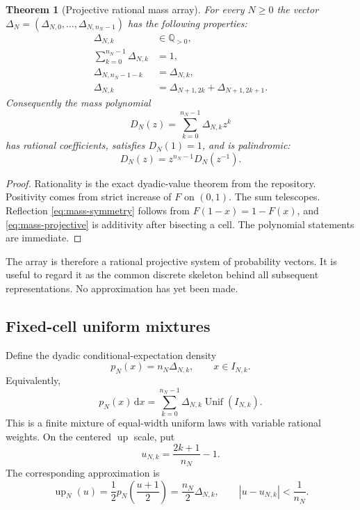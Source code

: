 \documentclass[11pt,oneside]{article}
\newtheorem{theorem}{Theorem}[section]
\theoremstyle{definition}
\theoremstyle{remark}
\newcommand{\Q}{\mathbb Q}
\newcommand{\Up}{\operatorname{up}}
\newcommand{\dd}{\,\mathrm d}
\begin{document}
\begin{theorem}[Projective rational mass array]
\label{thm:projective-masses}
For every $N\ge0$ the vector
$\Delta_N=(\Delta_{N,0},\ldots,\Delta_{N,n_N-1})$ has the following properties:
\begin{align}
 \Delta_{N,k}&\in\Q_{>0},\label{eq:mass-rational}\\
 \sum_{k=0}^{n_N-1}\Delta_{N,k}&=1,\label{eq:mass-sum}\\
 \Delta_{N,n_N-1-k}&=\Delta_{N,k},\label{eq:mass-symmetry}\\
 \Delta_{N,k}&=\Delta_{N+1,2k}+\Delta_{N+1,2k+1}.
 \label{eq:mass-projective}
\end{align}
Consequently the mass polynomial
\begin{equation}\label{eq:mass-polynomial}
 D_N(z)=\sum_{k=0}^{n_N-1}\Delta_{N,k}z^k
\end{equation}
has rational coefficients, satisfies $D_N(1)=1$, and is palindromic:
\begin{equation}\label{eq:D-palindromic}
 D_N(z)=z^{n_N-1}D_N(z^{-1}).
\end{equation}
\end{theorem}

\begin{proof}
Rationality is the exact dyadic-value theorem from the repository.  Positivity
comes from strict increase of $F$ on $(0,1)$.  The sum telescopes.  Reflection
\eqref{eq:mass-symmetry} follows from $F(1-x)=1-F(x)$, and
\eqref{eq:mass-projective} is additivity after bisecting a cell.  The polynomial
statements are immediate.
\end{proof}

The array is therefore a rational projective system of probability vectors.
It is useful to regard it as the common discrete skeleton behind all subsequent
representations.  No approximation has yet been made.

\subsection{Fixed-cell uniform mixtures}

Define the dyadic conditional-expectation density
\begin{equation}\label{eq:pN-def}
 p_N(x)=n_N\Delta_{N,k},\qquad x\in I_{N,k}.
\end{equation}
Equivalently,
\begin{equation}\label{eq:pN-mixture}
 p_N(x)\dd x
 =\sum_{k=0}^{n_N-1}\Delta_{N,k}
   \operatorname{Unif}(I_{N,k}).
\end{equation}
This is a finite mixture of equal-width uniform laws with variable rational
weights.  On the centered $\Up$ scale, put
\begin{equation}\label{eq:up-cell-centers}
 u_{N,k}=\frac{2k+1}{n_N}-1.
\end{equation}
The corresponding approximation is
\begin{equation}\label{eq:upN-def}
 \Up_N(u)=\frac12p_N\!\left(\frac{u+1}{2}\right)
 =\frac{n_N}{2}\Delta_{N,k},
 \qquad |u-u_{N,k}|<\frac1{n_N}.
\end{equation}
\end{document}
